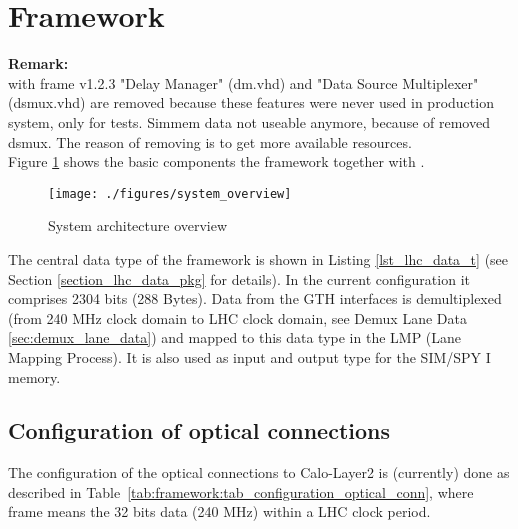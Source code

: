 \section{Framework}\label{sec:framework}
\textbf{Remark:}\\
with frame v1.2.3 "Delay Manager" (dm.vhd) and "Data Source Multiplexer" (dsmux.vhd) are removed because these features were never used in production system, only for tests.
Simmem data not useable anymore, because of removed dsmux.
The reason of removing is to get more available resources.\\

Figure \ref{fig_system_overview} shows the basic components the framework together with \rop.

\begin{figure}[h]
\texttt{[image: ./figures/system\_overview]}
\caption{System architecture overview}
\label{fig_system_overview}
\end{figure}

The central data type of the framework is shown in Listing \ref{lst_lhc_data_t} (see Section \ref{section_lhc_data_pkg} for details). In the current configuration it comprises
2304 bits (288 Bytes). Data from the GTH interfaces is demultiplexed (from 240 MHz clock domain to LHC clock domain, see Demux Lane Data \ref{sec:demux_lane_data}) and mapped to this data type in the LMP (Lane Mapping Process). It is also used as input and output type for the SIM/SPY I memory.

\subsection{Configuration of optical connections} \label{sec:sec_configuration_optical_conn}
The configuration of the optical connections to Calo-Layer2 is (currently) done as described in Table~\ref{tab:framework:tab_configuration_optical_conn}, where
frame means the 32 bits data (240 MHz) within a LHC clock period.

